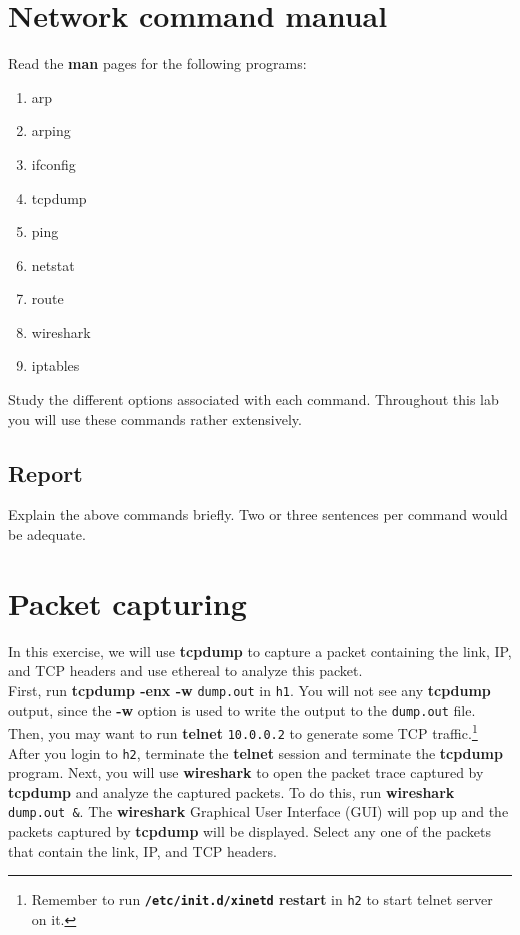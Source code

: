 \documentclass[10pt,a4paper]{article}
\numberwithin{equation}{section}
\numberwithin{figure}{section}
\numberwithin{table}{section}
\begin{document}
    \section{Network command manual}
    Read the \textbf{man} pages for the following programs:
\begin{multicols}{3}
    \begin{enumerate}
        \item arp
        \item arping
        \item ifconfig
        \item tcpdump
        \item ping
        \item netstat
        \item route
        \item wireshark
        \item iptables
    \end{enumerate}
\end{multicols}
    Study the different options associated with each command.
    Throughout this lab you will use these commands rather extensively.
    \subsection*{Report}
    Explain the above commands briefly.
    Two or three sentences per command would be adequate.

    \section{Packet capturing}
    In this exercise, we will use \textbf{tcpdump} to capture a packet containing the link, IP, and TCP headers and use ethereal to analyze this packet. \\
    First, run \textbf{tcpdump -enx -w} \texttt{dump.out} in \texttt{h1}.
    You will not see any \textbf{tcpdump} output, since the \textbf{-w} option is used to write the output to the \texttt{dump.out} file. \\
    Then, you may want to run \textbf{telnet} \texttt{10.0.0.2} to generate some TCP traffic.\footnote{Remember to run \textbf{\texttt{/etc/init.d/xinetd} restart} in \texttt{h2} to start telnet server on it.}
    After you login to \texttt{h2}, terminate the \textbf{telnet} session and terminate the \textbf{tcpdump} program.
    Next, you will use \textbf{wireshark} to open the packet trace captured by \textbf{tcpdump} and analyze the captured packets.
    To do this, run \textbf{wireshark} \texttt{dump.out \&}.
    The \textbf{wireshark} Graphical User Interface (GUI) will pop up and the packets captured by \textbf{tcpdump} will be displayed.
    Select any one of the packets that contain the link, IP, and TCP headers.
\end{document}
